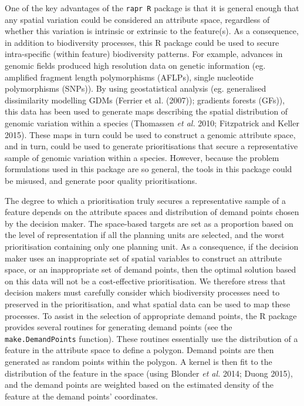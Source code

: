 \documentclass[11pt,]{article}
\begin{document}
One of the key advantages of the \texttt{rapr R} package is that it is
general enough that any spatial variation could be considered an
attribute space, regardless of whether this variation is intrinsic or
extrinsic to the feature(s). As a consequence, in addition to
biodiversity processes, this R package could be used to secure
intra-specific (within feature) biodiversity patterns. For example,
advances in genomic fields produced high resolution data on genetic
information (eg. amplified fragment length polymorphisms (AFLPs), single
nucleotide polymorphisms (SNPs)). By using geostatistical analysis (eg.
generalised dissimilarity modelling GDMs (Ferrier et al. (2007));
gradients forests (GFs)), this data has been used to generate maps
describing the spatial distribution of genomic variation within a
species (Thomassen \emph{et al.} 2010; Fitzpatrick and Keller 2015).
These maps in turn could be used to construct a genomic attribute space,
and in turn, could be used to generate prioritisations that secure a
representative sample of genomic variation within a species. However,
because the problem formulations used in this package are so general,
the tools in this package could be misused, and generate poor quality
prioritisations.

The degree to which a prioritisation truly secures a representative
sample of a feature depends on the attribute spaces and distribution of
demand points chosen by the decision maker. The space-based targets are
set as a proportion based on the level of representation if all the
planning units are selected, and the worst prioritisation containing
only one planning unit. As a consequence, if the decision maker uses an
inappropriate set of spatial variables to construct an attribute space,
or an inappropriate set of demand points, then the optimal solution
based on this data will not be a cost-effective prioritisation. We
therefore stress that decision makers must carefully consider which
biodiversity processes need to preserved in the prioritisation, and what
spatial data can be used to map these processes. To assist in the
selection of appropriate demand points, the R package provides several
routines for generating demand points (see the
\texttt{make.DemandPoints} function). These routines essentially use the
distribution of a feature in the attribute space to define a polygon.
Demand points are then generated as random points within the polygon. A
kernel is then fit to the distribution of the feature in the space
(using Blonder \emph{et al.} 2014; Duong 2015), and the demand points
are weighted based on the estimated density of the feature at the demand
points' coordinates.
\end{document}
